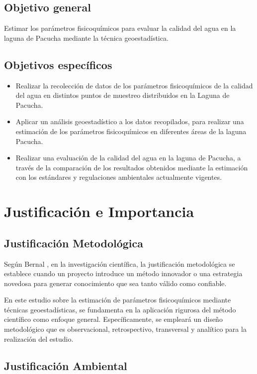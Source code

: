 \subsection{Objetivo general}

Estimar los parámetros fisicoquímicos para evaluar la calidad del agua en la laguna de Pacucha mediante la técnica geoestadística.

\subsection{Objetivos específicos}

\begin{itemize}
    \item Realizar la recolección de datos de los parámetros fisicoquímicos de la calidad del agua en distintos puntos de muestreo distribuidos en la Laguna de Pacucha.
    \item Aplicar un análisis geoestadístico a los datos recopilados, para realizar una estimación de los parámetros fisicoquímicos en diferentes áreas de la laguna Pacucha.
    \item Realizar una evaluación de la calidad del agua en la laguna de Pacucha, a través de la comparación de los resultados obtenidos mediante la estimación con los estándares y regulaciones ambientales actualmente vigentes.
\end{itemize}

\section{Justificación e Importancia}
\subsection{Justificación Metodológica}

Según Bernal \cite{bernal2010metodologia}, en la investigación científica, la justificación metodológica se establece cuando un proyecto introduce un método innovador o una estrategia novedosa para generar conocimiento que sea tanto válido como confiable.

En este estudio sobre la estimación de parámetros fisicoquímicos mediante técnicas geoestadísticas, se fundamenta en la aplicación rigurosa del método científico como enfoque general. Específicamente, se empleará un diseño metodológico que es observacional, retrospectivo, transversal y analítico para la realización del estudio.

\subsection{Justificación Ambiental}

